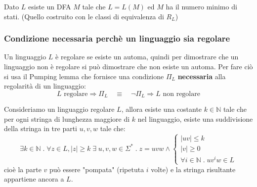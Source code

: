 \documentclass[a4paper]{article}
\begin{document}
\begin{theorem}
\begin{itemize}
\begin{itemize}
      \end{itemize}
      Dato \( L \) esiste un DFA \( M \) tale che \( L = L(M) \) ed \( M \) ha il numero
      minimo di stati. (Quello costruito con le classi di equivalenza di \( R_L \))
  \end{itemize}
\end{theorem}


\subsubsection{Condizione necessaria perchè un linguaggio sia regolare}
Un linguaggio \( L \) è regolare se esiste un automa, quindi per dimostrare che
un linguaggio non è regolare si può dimostrare che non esiste un automa. Per fare ciò
si usa il Pumping lemma che fornisce una condizione \( \Pi_L \) \textbf{necessaria}
alla regolarità di un linguaggio:
\[
  L \text{ regolare} \Rightarrow \Pi_L \quad \equiv \quad \neg \Pi_L \Rightarrow L \text{ non regolare}
\] 

\begin{theorem}
  Consideriamo un linguaggio regolare \( L \), allora esiste una costante
  \( k \in \mathbb{N} \) tale che per ogni stringa di lunghezza maggiore di \( k \) nel
  linguaggio, esiste una suddivisione della stringa in tre parti \( u,v,w \) tale che:
  \[
    \exists k \in \mathbb{N} \;.\; \forall z \in L, |z| \ge k \;\exists\; u,v,w \in \Sigma^* \;.\;
    z = uvw \wedge \begin{cases}
      |uv| \le k\\
      |v| \ge 0\\
      \forall i \in \mathbb{N} \;.\; uv^iw \in L
    \end{cases}
  \] 
  cioè la parte \( v \) può essere "pompata" (ripetuta \( i \) volte) e la stringa
  risultante appartiene ancora a \( L \).
\end{theorem}
\end{document}
